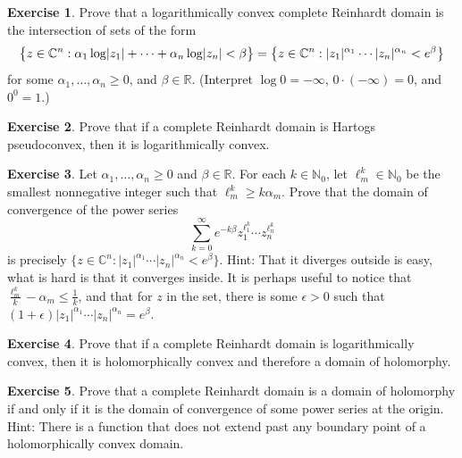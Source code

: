\documentclass[12pt,openany]{book}
\newcommand{\avoidbreak}{\postdisplaypenalty=100}
\newcommand{\sabs}[1]{\lvert {#1} \rvert}
\newcommand{\C}{{\mathbb{C}}}
\newcommand{\R}{{\mathbb{R}}}
\newcommand{\N}{{\mathbb{N}}}
\theoremstyle{plain}
\theoremstyle{remark}
\theoremstyle{definition}
\newenvironment{exbox}{%
    \def\FrameCommand{\vrule width 1pt \relax\hspace{10pt}}%
    \MakeFramed{\advance\hsize-\width\FrameRestore}%
}{%
    \endMakeFramed
}
\theoremstyle{exercise}
\newtheorem{exercise}{Exercise}[section]
\theoremstyle{example}
\begin{document}
\begin{exbox}
\begin{exercise}
Prove that a logarithmically convex complete Reinhardt domain
is the intersection of sets of the form
\begin{equation*}
\bigl\{ z \in \C^n : \alpha_1 \log \sabs{z_1} + \cdots + \alpha_n \log
\sabs{z_n} < \beta  \bigr\}
=
\bigl\{ z \in \C^n : \sabs{z_1}^{\alpha_1} \cdots \sabs{z_n}^{\alpha_n}
< e^\beta \bigr\}
\avoidbreak
\end{equation*}
for some $\alpha_1,\ldots,\alpha_n \geq 0$, and $\beta \in \R$.
(Interpret $\log 0 = -\infty$, $0 \cdot (-\infty) = 0$, and $0^0 = 1$.)
\end{exercise}

\begin{exercise}
Prove that if a complete Reinhardt domain is Hartogs
pseudoconvex, then it is logarithmically convex.
\end{exercise}

\begin{exercise}
\pagebreak[2]
Let $\alpha_1,\ldots,\alpha_n \geq 0$ and $\beta \in \R$.
For each $k \in \N_0$, let $\ell_m^k \in \N_0$ be the smallest nonnegative integer such that
$\ell_m^k \geq k \alpha_m$.
Prove that the domain of convergence of the power series
\begin{equation*}
\sum_{k=0}^\infty e^{-k\beta}
z_1^{\ell_1^k}
\cdots
z_n^{\ell_n^k}
\end{equation*}
is precisely
$\bigl\{ z \in \C^n :
\sabs{z_1}^{\alpha_1} \cdots \sabs{z_n}^{\alpha_n}
< e^\beta \bigr\}$.
Hint: That it diverges outside is easy, what is hard is that it converges
inside.  It is perhaps useful to notice that
$\frac{\ell_m^k}{k}-\alpha_m \leq \frac{1}{k}$, and
that for $z$ in the set, there is some $\epsilon > 0$ such that
$(1+\epsilon)\sabs{z_1}^{\alpha_1} \cdots \sabs{z_n}^{\alpha_n} =
e^{\beta}$.
\end{exercise}

\begin{exercise}
Prove that if a complete Reinhardt domain is 
logarithmically convex,
then it is holomorphically
convex and therefore a domain of holomorphy.
\end{exercise}

\begin{exercise}
Prove that a complete Reinhardt domain is
a domain of holomorphy if and only if it is the
domain of convergence of some power series at the origin.  Hint: There is a
function that does not extend past any boundary point of a holomorphically
convex domain.
\end{exercise}
\end{exbox}
\end{document}
